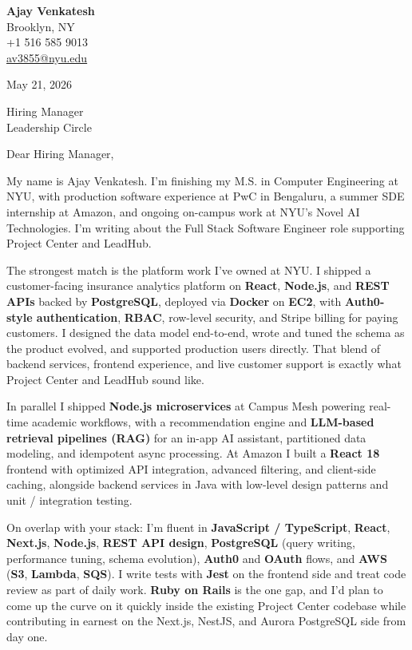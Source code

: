 \documentclass[letterpaper,11pt]{article}
\begin{document}
\begin{flushleft}
\textbf{\large Ajay Venkatesh} \\
Brooklyn, NY \\
+1 516 585 9013 \\
\href{mailto:av3855@nyu.edu}{av3855@nyu.edu}
\end{flushleft}
\vspace{10pt}
May 21, 2026
\vspace{6pt}

Hiring Manager \\
Leadership Circle

\vspace{10pt}

Dear Hiring Manager,

My name is Ajay Venkatesh. I'm finishing my M.S. in Computer Engineering at NYU, with production software experience at PwC in Bengaluru, a summer SDE internship at Amazon, and ongoing on-campus work at NYU's Novel AI Technologies. I'm writing about the Full Stack Software Engineer role supporting Project Center and LeadHub.

The strongest match is the platform work I've owned at NYU. I shipped a customer-facing insurance analytics platform on \textbf{React}, \textbf{Node.js}, and \textbf{REST APIs} backed by \textbf{PostgreSQL}, deployed via \textbf{Docker} on \textbf{EC2}, with \textbf{Auth0-style authentication}, \textbf{RBAC}, row-level security, and Stripe billing for paying customers. I designed the data model end-to-end, wrote and tuned the schema as the product evolved, and supported production users directly. That blend of backend services, frontend experience, and live customer support is exactly what Project Center and LeadHub sound like.

In parallel I shipped \textbf{Node.js microservices} at Campus Mesh powering real-time academic workflows, with a recommendation engine and \textbf{LLM-based retrieval pipelines (RAG)} for an in-app AI assistant, partitioned data modeling, and idempotent async processing. At Amazon I built a \textbf{React 18} frontend with optimized API integration, advanced filtering, and client-side caching, alongside backend services in Java with low-level design patterns and unit / integration testing.

On overlap with your stack: I'm fluent in \textbf{JavaScript / TypeScript}, \textbf{React}, \textbf{Next.js}, \textbf{Node.js}, \textbf{REST API design}, \textbf{PostgreSQL} (query writing, performance tuning, schema evolution), \textbf{Auth0} and \textbf{OAuth} flows, and \textbf{AWS} (\textbf{S3}, \textbf{Lambda}, \textbf{SQS}). I write tests with \textbf{Jest} on the frontend side and treat code review as part of daily work. \textbf{Ruby on Rails} is the one gap, and I'd plan to come up the curve on it quickly inside the existing Project Center codebase while contributing in earnest on the Next.js, NestJS, and Aurora PostgreSQL side from day one.
\end{document}
